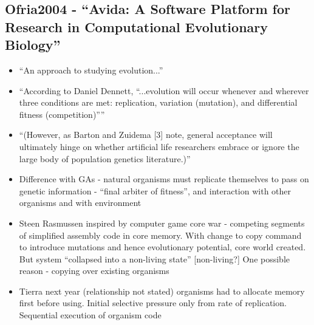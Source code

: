 		\hypertarget{ofria2004---avida-a-software-platform-for-research-in-computational-evolutionary-biology}{\subsection{Ofria2004
				- ``Avida: A Software Platform for Research in Computational
				Evolutionary
				Biology''}\label{ofria2004---avida-a-software-platform-for-research-in-computational-evolutionary-biology}}
		
		\begin{itemize}
			\item
			
			``An approach to studying evolution...''
			
			\item
			
			``According to Daniel Dennett, ``...evolution will occur whenever and
			wherever three conditions are met: replication, variation (mutation),
			and differential fitness (competition)''''
			
			\item
			
			``(However, as Barton and Zuidema {[}3{]} note, general acceptance
			will ultimately hinge on whether artificial life researchers embrace
			or ignore the large body of population genetics literature.)''
			
			\item
			
			Difference with GAs - natural organisms must replicate themselves to
			pass on genetic information - ``final arbiter of fitness'', and
			interaction with other organisms and with environment
			
			\item
			
			Steen Rasmussen inspired by computer game core war - competing
			segments of simplified assembly code in core memory. With change to
			copy command to introduce mutations and hence evolutionary potential,
			core world created. But system ``collapsed into a non-living state''
			{[}non-living?{]} One possible reason - copying over existing
			organisms
			
			\item
			
			Tierra next year (relationship not stated) organisms had to allocate
			memory first before using. Initial selective pressure only from rate
			of replication. Sequential execution of organism code
			

\end{itemize}
